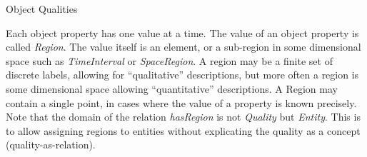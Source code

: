 \begin{ODP}{Object Qualities}
\end{ODP}

Each object property has one value at a time. The value of an object property is called \emph{Region}.
The value itself is an element, or a sub-region in some dimensional
space such as \emph{TimeInterval} or \emph{SpaceRegion}.
A region may be a finite set of discrete labels, allowing for ``qualitative'' descriptions,
but more often a region is some dimensional space allowing ``quantitative'' descriptions.
A Region may contain a single point, in cases where the value of a property is known precisely.
Note that the domain of the relation \emph{hasRegion} is not \emph{Quality} but \emph{Entity}.
This is to allow assigning regions to entities without explicating the quality as a concept (quality-as-relation).

